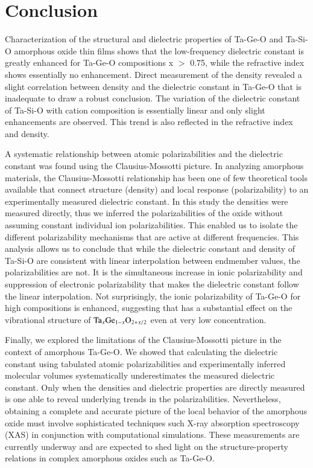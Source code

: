 \section{Conclusion}
Characterization of the structural and dielectric properties of Ta-Ge-O and Ta-Si-O amorphous oxide thin films shows that the low-frequency dielectric constant is greatly enhanced for Ta-Ge-O compositions x $>$ 0.75, while the refractive index shows essentially no enhancement. Direct measurement of the density revealed a slight correlation between density and the dielectric constant in Ta-Ge-O that is inadequate to draw a robust conclusion. The variation of the dielectric constant of Ta-Si-O with cation composition is essentially linear and only slight enhancements are observed. This trend is also reflected in the refractive index and density. 

A systematic relationship between atomic polarizabilities and the dielectric constant was found using the Clausius-Mossotti picture. In analyzing amorphous materials, the Clausius-Mossotti relationship has been one of few theoretical tools available that connect structure (density) and local response (polarizability) to an experimentally measured dielectric constant. 
In this study the densities were measured directly, thus we inferred the polarizabilities of the oxide without assuming constant individual ion polarizabilities. This enabled us to isolate the different polarizability mechanisms that are active at different frequencies. This analysis allows us to conclude that while the dielectric constant and density of Ta-Si-O are consistent with linear interpolation between endmember values, the polarizabilities are not. It is the simultaneous increase in ionic polarizability and suppression of electronic polarizability that makes the dielectric constant follow the linear interpolation. 
Not surprisingly, the ionic polarizability of Ta-Ge-O for high  compositions is enhanced, suggesting that  has a substantial effect on the vibrational structure of $\textnormal{Ta}_{x}\textnormal{Ge}_{1-x}\textnormal{O}_{2+x/2}$ even at very low  concentration. 

Finally, we explored the limitations of the Clausius-Mossotti picture in the context of amorphous Ta-Ge-O. We showed that calculating the dielectric constant using tabulated atomic polarizabilities and experimentally inferred molecular volumes systematically underestimates the measured dielectric constant. Only when the densities and dielectric properties are directly measured is one able to reveal underlying trends in the polarizabilities. Nevertheless, obtaining a complete and accurate picture of the local behavior of the amorphous oxide must involve sophisticated techniques such X-ray absorption spectroscopy (XAS) in conjunction with computational simulations. These measurements are currently underway and are expected to shed light on the structure-property relations in complex amorphous oxides such as Ta-Ge-O. 

